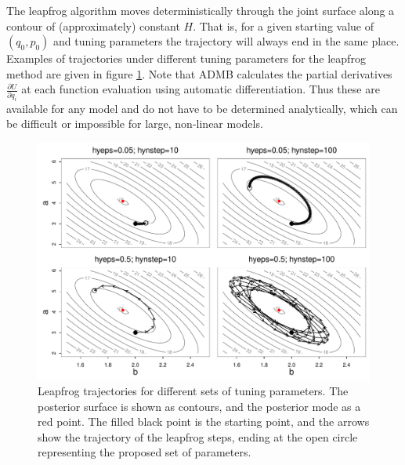 \documentclass{article}\usepackage[]{graphicx}\usepackage[]{color}
\begin{document}
The leapfrog algorithm moves deterministically through the
joint surface along a contour of (approximately) constant
$H$. That is, for a given starting value of $(q_0,p_0)$ and
tuning parameters the trajectory will always end in the same
place. Examples of trajectories under different tuning
parameters for the leapfrog method are given in figure
\ref{fig:hybrid_grid_trace}. Note that ADMB calculates the
partial derivatives $\frac{\partial{U}}{\partial{q_i}}$ at
each function evaluation using automatic
differentiation. Thus these are available for any model and
do not have to be determined analytically, which can be
difficult or impossible for large, non-linear models.

\begin{figure}[h]
  \centering
  \includegraphics[width=5in]{../plots/hybrid_grid_trace.pdf}
  \caption{Leapfrog trajectories for different sets of
    tuning parameters. The posterior surface is shown as
    contours, and the posterior mode as a red point. The
    filled black point is the starting point, and the arrows
    show the trajectory of the leapfrog steps, ending at the
    open circle representing the proposed set of
    parameters.}
  \label{fig:hybrid_grid_trace}
\end{figure}
\end{document}
